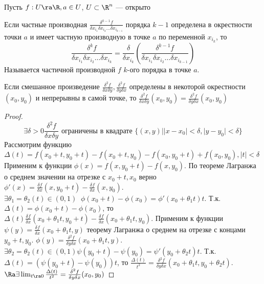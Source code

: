 Пусть \(f: U \ra \R, a \in U\), \(U \subset \R^n\) --- открыто
\begin{definition}
    Если частные производная \(\frac{\delta^{k - 1} f}{\delta x_{i_1}\delta x_{i_2}\dots\delta x_{i_{k-1}}}\) порядка \(k - 1\) определена в окрестности точки \(a\) и имеет частную производную в точке \(a\) по переменной \(x_{i_k}\), то 
    \[\frac{\delta^k f}{\delta x_{i_1}\delta x_{i_2}\dots\delta x_{i_k}} = \frac{\delta }{\delta x_{i_k}}\left(\frac{\delta^{k - 1} f}{\delta x_{i_1}\delta x_{i_2}\dots\delta x_{i_{k-1}}}\right)\]
    Называется частичной производной \(f\) \(k\)-ого порядка в точке \(a\).
\end{definition}

\begin{theorem}[Шварц]
    Если смешанное произведение \(\frac{\delta^2 f}{\delta x \delta y}, \frac{\delta^2 f}{\delta y \delta x}\) определены в некоторой окрестности \((x_0, y_0)\) и непрерывны в самой точке, то \(\frac{\delta^2 f}{\delta x \delta y}(x_0, y_0) = \frac{\delta^2 f}{\delta y \delta x}(x_0, y_0)\)
\end{theorem}
\begin{proof}
    \[\exists \delta > 0 \frac{\delta^2 f}{\delta x \delta y}\text{ ограничены в квадрате }\{(x, y) | |x - x_0| < \delta, |y - y_0| < \delta\}\]
    Рассмотрим функцию \(\Delta(t) = f(x_0 + t, y_0 + t) - f(x_0 + t, y_0) - f(x_0, y_0 + t) + f(x_0, y_0), |t| < \delta\)
    Применим к функции \(\phi(x) = f(x, y_0 + t) - f(x, y_0)\). По теореме Лагранжа о среднем значении на отрезке с \(x_0 + t, x_0\) верно \(\phi'(x) = \frac{\delta f}{\delta x}(x, y_0 + t) - \frac{\delta f}{\delta x}(x, y_0)\). \(\exists \theta_1 = \theta_2(t) \in (0, 1)\;\; \phi(x_0 + t) - \phi(x_0) = \phi'(x_0 + \theta_1t)t\). Т.к. \(\Delta(t) = \phi(x_0 + t) - \phi(x_0)\), то \(\Delta(t)  \frac{\delta f}{\delta x}(x_0 + \theta_1 t, y_0 + t) - \frac{\delta f}{\delta x}(x_0 + \theta_1t, y_0)\). Применим к функции \(\psi(y) = \frac{\delta f}{\delta x}(x_0 + \theta_1 t, y)\) теорему Лагранжа о среднем на отрезке с концами \(y_0 + t, y_0\). 
    \(\phi(y) = \frac{\delta^2 f}{\delta y \delta x}(x_0 + \theta_1 t, y)\). \(\exists \theta_2 = \theta_2(t) \in (0, 1) \psi(y_0 + t) - \psi(y_0) = \psi'(y_0 + \theta_2t)t\). Т.к. \(\Delta(t) = (\psi(y_0 + t) - \psi(y_0))t\), то \(\frac{\Delta(t)}{t^2} = \frac{\delta^2 f}{\delta y \delta x}(x_0 + \theta_1 t, y_0 + \theta_2t)\). \(\Ra \exists \lim_{t \ra 0} \frac{\Delta(t)}{t^2} = \frac{\delta^2 f}{\delta y\delta x}(x_0, y_0)\)
\end{proof}